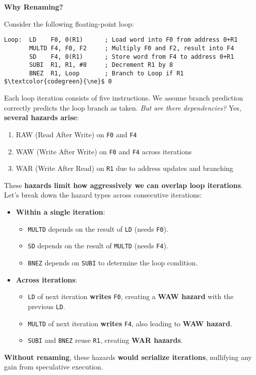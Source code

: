 \highspace
\begin{flushleft}
    \textcolor{Green3}{ \textbf{Why Renaming?}}
\end{flushleft}
Consider the following floating-point loop:
\begin{lstlisting}[language=unknown, mathescape=true]
Loop:  LD    F0, 0(R1)      ; Load word into F0 from address 0+R1
       MULTD F4, F0, F2     ; Multiply F0 and F2, result into F4
       SD    F4, 0(R1)      ; Store word from F4 to address 0+R1
       SUBI  R1, R1, #8     ; Decrement R1 by 8
       BNEZ  R1, Loop       ; Branch to Loop if R1 $\textcolor{codegreen}{\ne}$ 0
\end{lstlisting}
Each loop iteration consists of five instructions. We assume branch prediction correctly predicts the loop branch as taken. \emph{But are there dependencies?} Yes, \textbf{several hazards arise}:
\begin{enumerate}
    \item RAW (Read After Write) on \texttt{F0} and \texttt{F4}
    \item WAW (Write After Write) on \texttt{F0} and \texttt{F4} across iterations
    \item WAR (Write After Read) on \texttt{R1} due to address updates and branching
\end{enumerate}
These \textbf{hazards limit how aggressively we can overlap loop iterations}. Let's break down the hazard types across consecutive iterations:
\begin{itemize}
    \item \textbf{Within a single iteration}:
    \begin{itemize}
        \item \texttt{MULTD} depends on the result of \texttt{LD} (needs \texttt{F0}).
        \item \texttt{SD} depends on the result of \texttt{MULTD} (needs \texttt{F4}).
        \item \texttt{BNEZ} depends on \texttt{SUBI} to determine the loop condition.
    \end{itemize}
    
    \item \textbf{Across iterations}:
    \begin{itemize}
        \item \texttt{LD} of next iteration \textbf{writes} \texttt{F0}, creating a \textbf{WAW hazard} with the previous \texttt{LD}.
        \item \texttt{MULTD} of next iteration \textbf{writes} \texttt{F4}, also leading to \textbf{WAW hazard}.
        \item \texttt{SUBI} and \texttt{BNEZ} reuse \texttt{R1}, creating \textbf{WAR hazards}.
    \end{itemize}
\end{itemize}
\textbf{Without renaming}, these hazards \textbf{would serialize iterations}, nullifying any gain from speculative execution.

